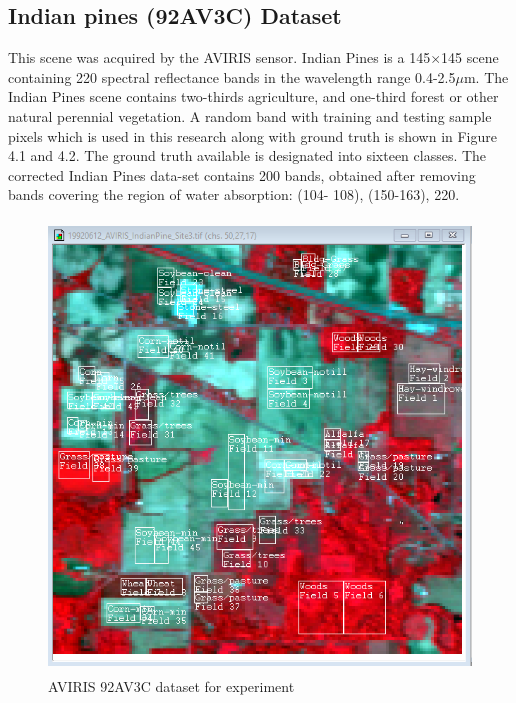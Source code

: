 \documentclass[document.tex]{subfiles}
\begin{document}
\subsection{Indian pines (92AV3C) Dataset}
\noindent This scene was acquired by the AVIRIS sensor. Indian Pines is a 145$\times$145 scene containing
220 spectral reflectance bands in the wavelength range 0.4-2.5$\mu$m. The Indian Pines scene
contains two-thirds agriculture, and one-third forest or other natural perennial vegetation.
A random band with training and testing sample pixels which is used in this research along with ground truth is shown in Figure 4.1 and 4.2. The ground truth
available is designated into sixteen classes. The corrected Indian Pines data-set contains
200 bands, obtained after removing bands covering the region of water absorption: (104-
108), (150-163), 220.
\begin{figure}[H]
	\begin{center}
		\includegraphics[height=12.0cm]{imgs/Dataset.png}
	\end{center}
	\caption{AVIRIS 92AV3C dataset for experiment}
	\label{fig:AVIRIS 92AV3C dataset for experiment}
\end{figure}
\end{document}
